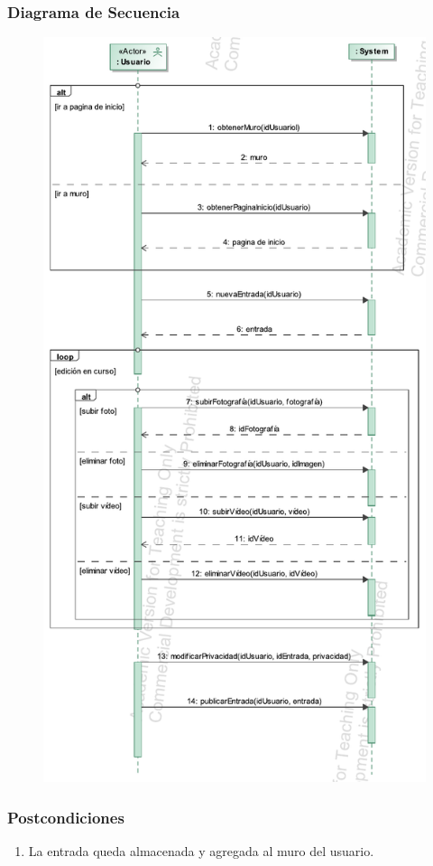 \documentclass[12pt, a4paper, titlepage]{article}
\begin{document}
\subsubsection{Diagrama de Secuencia}

\begin{figure}[h]
	\centering
	\includegraphics[height=\textheight]{Imagenes/Crear_entrada}
\end{figure}


\subsubsection{Postcondiciones}
\begin{enumerate}
	\item La entrada queda almacenada y agregada al muro del usuario.
\end{enumerate}
\end{document}
